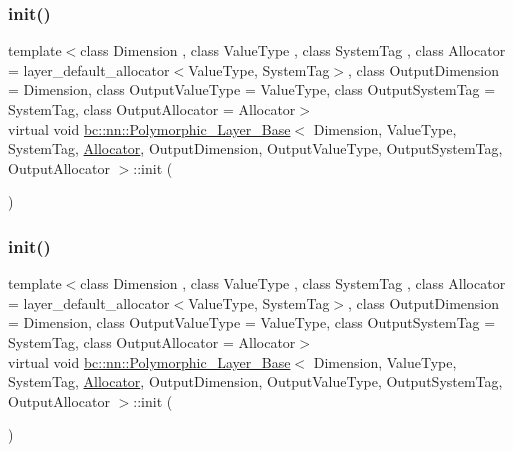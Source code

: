 \mbox{\label{structbc_1_1nn_1_1Polymorphic__Layer__Base_a2259b176573690bfbbc93adc743212c9}} 
\subsubsection{\texorpdfstring{init()}{init()}\hspace{0.1cm}{\footnotesize\ttfamily [1/2]}}
{\footnotesize\ttfamily template$<$class Dimension , class Value\+Type , class System\+Tag , class Allocator  = layer\+\_\+default\+\_\+allocator$<$\+Value\+Type, System\+Tag$>$, class Output\+Dimension  = Dimension, class Output\+Value\+Type  = Value\+Type, class Output\+System\+Tag  = System\+Tag, class Output\+Allocator  = Allocator$>$ \\
virtual void \hyperlink{structbc_1_1nn_1_1Polymorphic__Layer__Base}{bc\+::nn\+::\+Polymorphic\+\_\+\+Layer\+\_\+\+Base}$<$ Dimension, Value\+Type, System\+Tag, \hyperlink{classbc_1_1allocators_1_1Allocator}{Allocator}, Output\+Dimension, Output\+Value\+Type, Output\+System\+Tag, Output\+Allocator $>$\+::init (\begin{DoxyParamCaption}{ }\end{DoxyParamCaption})\hspace{0.3cm}{\ttfamily [pure virtual]}}

\mbox{\label{structbc_1_1nn_1_1Polymorphic__Layer__Base_a2259b176573690bfbbc93adc743212c9}} 
\subsubsection{\texorpdfstring{init()}{init()}\hspace{0.1cm}{\footnotesize\ttfamily [2/2]}}
{\footnotesize\ttfamily template$<$class Dimension , class Value\+Type , class System\+Tag , class Allocator  = layer\+\_\+default\+\_\+allocator$<$\+Value\+Type, System\+Tag$>$, class Output\+Dimension  = Dimension, class Output\+Value\+Type  = Value\+Type, class Output\+System\+Tag  = System\+Tag, class Output\+Allocator  = Allocator$>$ \\
virtual void \hyperlink{structbc_1_1nn_1_1Polymorphic__Layer__Base}{bc\+::nn\+::\+Polymorphic\+\_\+\+Layer\+\_\+\+Base}$<$ Dimension, Value\+Type, System\+Tag, \hyperlink{classbc_1_1allocators_1_1Allocator}{Allocator}, Output\+Dimension, Output\+Value\+Type, Output\+System\+Tag, Output\+Allocator $>$\+::init (\begin{DoxyParamCaption}{ }\end{DoxyParamCaption})\hspace{0.3cm}{\ttfamily [pure virtual]}}

